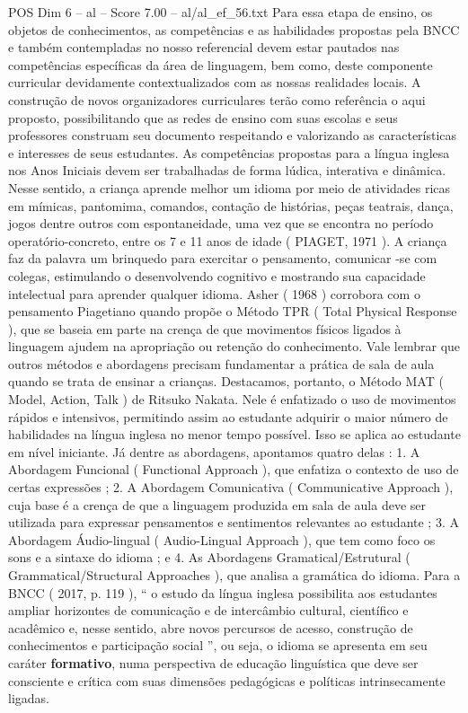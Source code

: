 \begin{textsample}{POS Dim 6 – al – Score 7.00 – al/al\_ef\_56.txt}
Para essa etapa de ensino, os objetos de conhecimentos, as competências e as habilidades propostas pela BNCC e também contempladas no nosso referencial devem estar pautados nas competências específicas da área de linguagem, bem como, deste componente curricular devidamente contextualizados com as nossas realidades locais.
A construção de novos organizadores curriculares terão como referência o aqui proposto, possibilitando que as redes de ensino com suas escolas e seus professores construam seu documento respeitando e valorizando as características e interesses de seus estudantes.
As competências propostas para a língua inglesa nos Anos Iniciais devem ser trabalhadas de forma lúdica, interativa e dinâmica.
Nesse sentido, a criança aprende melhor um idioma por meio de atividades ricas em mímicas, pantomima, comandos, contação de histórias, peças teatrais, dança, jogos dentre outros com espontaneidade, uma vez que se encontra no período operatório-concreto, entre os 7 e 11 anos de idade ( PIAGET, 1971 ).
A criança faz da palavra um brinquedo para exercitar o pensamento, comunicar -se com colegas, estimulando o desenvolvendo cognitivo e mostrando sua capacidade intelectual para aprender qualquer idioma.
Asher ( 1968 ) corrobora com o pensamento Piagetiano quando propõe o Método TPR ( Total Physical Response ), que se baseia em parte na crença de que movimentos físicos ligados à linguagem ajudem na apropriação ou retenção do conhecimento.
Vale lembrar que outros métodos e abordagens precisam fundamentar a prática de sala de aula quando se trata de ensinar a crianças.
Destacamos, portanto, o Método MAT ( Model, Action, Talk ) de Ritsuko Nakata.
Nele é enfatizado o uso de movimentos rápidos e intensivos, permitindo assim ao estudante adquirir o maior número de habilidades na língua inglesa no menor tempo possível.
Isso se aplica ao estudante em nível iniciante.
Já dentre as abordagens, apontamos quatro delas : 1.
A Abordagem Funcional ( Functional Approach ), que enfatiza o contexto de uso de certas expressões ; 2.
A Abordagem Comunicativa ( Communicative Approach ), cuja base é a crença de que a linguagem produzida em sala de aula deve ser utilizada para expressar pensamentos e sentimentos relevantes ao estudante ; 3.
A Abordagem Áudio-lingual ( Audio-Lingual Approach ), que tem como foco os sons e a sintaxe do idioma ; e 4.
As Abordagens Gramatical/Estrutural ( Grammatical/Structural Approaches ), que analisa a gramática do idioma.
Para a BNCC ( 2017, p. 119 ), “ o estudo da língua inglesa possibilita aos estudantes ampliar horizontes de comunicação e de intercâmbio cultural, científico e acadêmico e, nesse sentido, abre novos percursos de acesso, construção de conhecimentos e participação social ”, ou seja, o idioma se apresenta em seu caráter \textbf{formativo}, numa perspectiva de educação linguística que deve ser consciente e crítica com suas dimensões pedagógicas e políticas intrinsecamente ligadas.

\end{textsample}
